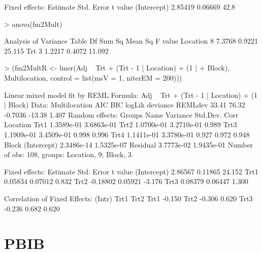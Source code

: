 \documentclass[12pt]{article}
\begin{document}
\begin{Schunk}
\begin{Soutput}
Fixed effects:
            Estimate Std. Error t value
(Intercept)  2.85419    0.06669    42.8
\end{Soutput}
\begin{Sinput}
> anova(fm2Mult)
\end{Sinput}
\begin{Soutput}
Analysis of Variance Table
         Df Sum Sq Mean Sq F value
Location  8 7.3768  0.9221  25.115
Trt       3 1.2217  0.4072  11.092
\end{Soutput}
\begin{Sinput}
> (fm2MultR <- lmer(Adj ~ Trt + (Trt - 1 | Location) + (1 | 
+     Block), Multilocation, control = list(msV = 1, niterEM = 200)))
\end{Sinput}
\begin{Soutput}
Linear mixed model fit by REML 
Formula: Adj ~ Trt + (Trt - 1 | Location) + (1 | Block) 
   Data: Multilocation 
   AIC   BIC  logLik deviance REMLdev
 33.41 76.32 -0.7036   -13.38   1.407
Random effects:
 Groups   Name        Variance   Std.Dev.   Corr              
 Location Trt1        1.3589e-01 3.6863e-01                   
          Trt2        1.0700e-01 3.2710e-01 0.989             
          Trt3        1.1909e-01 3.4509e-01 0.998 0.996       
          Trt4        1.1411e-01 3.3780e-01 0.927 0.972 0.948 
 Block    (Intercept) 2.3486e-14 1.5325e-07                   
 Residual             3.7773e-02 1.9435e-01                   
Number of obs: 108, groups: Location, 9; Block, 3

Fixed effects:
            Estimate Std. Error t value
(Intercept)  2.86567    0.11865  24.152
Trt1         0.05834    0.07012   0.832
Trt2        -0.18802    0.05921  -3.176
Trt3         0.08379    0.06447   1.300

Correlation of Fixed Effects:
     (Intr) Trt1   Trt2  
Trt1 -0.150              
Trt2 -0.306  0.620       
Trt3 -0.236  0.682  0.620
\end{Soutput}
\end{Schunk}


\section{PBIB}
\label{sec:PBIB}
\end{document}
